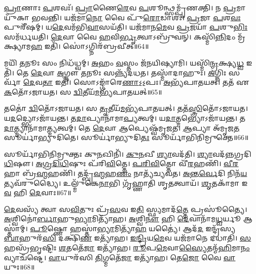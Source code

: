 \-\ul{𑌪𑍍𑌰𑌾}\-𑌣𑌾𑌃 \ul{𑌪}\-𑌶𑌵𑌃᳴।
\-\ul{𑌪𑍍𑌰𑌾}\-𑌣𑍈\-\ul{𑌰𑍇}\-𑌵 \ul{𑌪}\-𑌶𑍂𑌨𑍍𑌥𑍍𑌸𑌮𑍍𑌪𑍃᳴𑌣𑌕𑍍𑌤𑌿।
𑌨 \ul{𑌪𑍍𑌰}\-𑌮𑌾𑌯𑍁᳴𑌕𑌾 𑌭𑌵𑌨𑍍𑌤𑌿।
𑌯𑌜᳴𑌮𑌾\-\ul{𑌨𑍋} 𑌵𑍈 𑌪𑍁᳴\-\ul{𑌰𑍋}\-𑌡𑌾𑌶𑌃᳴।
\-\ul{𑌪𑍍𑌰}\-𑌜𑌾 \ul{𑌪}\-𑌶\-\ul{𑌵𑌃} 𑌪𑍁𑌰𑍀᳴𑌷𑌮𑍍।
𑌯\-\ul{𑌦𑍇}\-𑌵𑌮᳴𑌭𑌿\-\ul{𑌵𑌾}\-𑌸𑌯᳴𑌤𑌿।
𑌯𑌜᳴𑌮𑌾𑌨\-\ul{𑌮𑍇}\-𑌵 \ul{𑌪𑍍𑌰}\-𑌜𑌯𑌾᳴ \ul{𑌪}\-𑌶𑍁\-\ul{𑌭𑌿𑌃} 𑌸𑌮᳴𑌰𑍍𑌧𑌯𑌤𑌿।
\-\ul{𑌦𑍇}\-𑌵𑌾 𑌵𑍈 \ul{𑌹}\-𑌵𑌿\-\ul{𑌰𑍍𑌭𑍃}\-𑌤𑍍𑌵𑌾\-𑌽𑌬𑍍𑌰𑍁᳴𑌵𑌨𑍍।
𑌕𑌸𑍍𑌮𑌿᳴\-\ul{𑌨𑍍𑌨𑌿}\-𑌦𑌂 𑌮𑍍𑌰᳴𑌕𑍍𑌷𑍍𑌯𑌾𑌮\-\ul{𑌹} 𑌇𑌤𑌿᳴।
𑌸𑍋॑𑌽𑌗𑍍𑌨𑌿𑌰᳴𑌬𑍍𑌰𑌵𑍀𑌤𑍍॥64॥

𑌮𑌯𑌿᳴ \ul{𑌤}\-𑌨𑍂𑌃 𑌸𑌂 𑌨𑌿𑌧᳴𑌧𑍍𑌵𑌮𑍍।
\-\ul{𑌅}\-𑌹𑌂 \ul{𑌵}\-𑌸𑍍𑌤𑌂 𑌜᳴𑌨𑌯𑌿𑌷𑍍𑌯𑌾𑌮𑌿।
𑌯𑌸𑍍𑌮𑌿᳴\-\ul{𑌨𑍍𑌮𑍍𑌰}\-𑌕𑍍𑌷𑍍𑌯\-\ul{𑌧𑍍𑌵} 𑌇𑌤𑌿᳴।
𑌤𑍇 \ul{𑌦𑍇}\-𑌵𑌾 \ul{𑌅}\-𑌗𑍍𑌨𑍗 \ul{𑌤}\-𑌨𑍂𑌃 𑌸𑌨𑍍𑌨𑍍𑌯᳴𑌦𑌧𑌤।
𑌤𑌸𑍍𑌮𑌾᳴𑌦𑌾𑌹𑍁𑌃।
\-\ul{𑌅}\-𑌗𑍍𑌨𑌿𑌃 𑌸𑌰𑍍𑌵𑌾᳴ \ul{𑌦𑍇}\-𑌵\-\ul{𑌤𑌾} 𑌇𑌤𑌿᳴।
𑌸𑍋𑌽𑌙𑍍𑌗𑌾᳴𑌰𑍇\-\ul{𑌣𑌾}\-𑌽॒𑌽॒𑌪𑌃।
\-\ul{𑌅}\-𑌭𑍍𑌯᳴𑌪𑌾𑌤𑌯𑌤𑍍।
𑌤𑌤᳴ 𑌏\-\ul{𑌕}\-𑌤𑍋᳴\-𑌽𑌜𑌾𑌯𑌤।
𑌸 \ul{𑌦𑍍𑌵𑌿}\-𑌤𑍀𑌯᳴\-\ul{𑌮}\-𑌭𑍍𑌯᳴\-𑌪𑌾𑌤𑌯𑌤𑍍॥65॥

𑌤𑌤𑍋॑ \ul{𑌦𑍍𑌵𑌿}\-𑌤𑍋᳴\-𑌽𑌜𑌾𑌯𑌤।
𑌸 \ul{𑌤𑍃}\-𑌤𑍀𑌯᳴\-\ul{𑌮}\-𑌭𑍍𑌯᳴𑌪𑌾𑌤𑌯𑌤𑍍।
𑌤𑌤᳴\-\ul{𑌸𑍍𑌤𑍍𑌰𑌿}\-𑌤𑍋᳴\-𑌽𑌜𑌾𑌯𑌤।
𑌯\-\ul{𑌦}\-𑌦𑍍𑌭𑍍𑌯𑍋\-𑌽𑌜𑌾᳴𑌯𑌨𑍍𑌤।
𑌤\-\ul{𑌦𑌾}\-𑌪𑍍𑌯𑌾𑌨𑌾᳴𑌮𑌾\-\ul{𑌪𑍍𑌯}\-𑌤𑍍𑌵𑌮𑍍।
𑌯\-\ul{𑌦𑌾}\-𑌤𑍍𑌮𑌭𑍍𑌯𑍋\-𑌽𑌜𑌾᳴𑌯𑌨𑍍𑌤।
𑌤\-\ul{𑌦𑌾}\-𑌤𑍍𑌮𑍍𑌯𑌾𑌨𑌾᳴𑌮𑌾\-\ul{𑌤𑍍𑌮𑍍𑌯}\-𑌤𑍍𑌵𑌮𑍍।
𑌤𑍇 \ul{𑌦𑍇}\-𑌵𑌾 \ul{𑌆}\-𑌪𑍍𑌯𑍇𑌷𑍍𑌵᳴𑌮𑍃𑌜𑌤।
\-\ul{𑌆}\-𑌪𑍍𑌯𑌾 𑌅᳴𑌮𑍃𑌜\-\ul{𑌤} 𑌸𑍂𑌰𑍍𑌯𑌾॑𑌭𑍍𑌯𑍁𑌦𑌿𑌤𑍇।
𑌸𑍂𑌰𑍍𑌯𑌾॑𑌭𑍍𑌯𑍁𑌦𑌿\-\ul{𑌤𑌃} 𑌸𑍂𑌰𑍍𑌯𑌾᳴𑌭𑌿𑌨𑌿𑌮𑍍𑌰𑍁𑌕𑍍𑌤𑍇॥66॥

𑌸𑍂𑌰𑍍𑌯𑌾᳴𑌭𑌿𑌨𑌿𑌮𑍍𑌰𑍁𑌕𑍍𑌤𑌃 𑌕𑍁\-\ul{𑌨}\-𑌖𑌿𑌨𑌿᳴।
\-\ul{𑌕𑍁}\-\-\ul{𑌨}\-𑌖𑍀 \ul{𑌶𑍍𑌯𑌾}\-𑌵𑌦᳴𑌤𑌿।
\-\ul{𑌶𑍍𑌯𑌾}\-𑌵𑌦᳴𑌨𑍍𑌨𑌗𑍍𑌰\-𑌦𑌿\-\ul{𑌧𑌿}\-𑌷𑍗।
\-\ul{𑌅}\-\-\ul{𑌗𑍍𑌰}\-\-\ul{𑌦𑌿}\-\-\ul{𑌧𑌿}\-𑌷𑍁𑌃 𑌪᳴𑌰𑌿\-\ul{𑌵𑌿}\-𑌤𑍍𑌤𑍇।
\-\ul{𑌪}\-\-\ul{𑌰𑌿}\-\-\ul{𑌵𑌿}\-𑌤𑍍𑌤𑍋 𑌵𑍀᳴\-\ul{𑌰}\-𑌹𑌣𑌿᳴।
\-\ul{𑌵𑍀}\-\-\ul{𑌰}\-𑌹𑌾 𑌬𑍍𑌰᳴\-\ul{𑌹𑍍𑌮}\-𑌹𑌣𑌿᳴।
𑌤𑌦𑍍𑌬𑍍𑌰᳴\-\ul{𑌹𑍍𑌮}\-𑌹\-\ul{𑌣𑌂} 𑌨𑌾𑌤𑍍𑌯᳴𑌚𑍍𑌯𑌵𑌤।
\-\ul{𑌅}\-\-\ul{𑌨𑍍𑌤}\-\-\ul{𑌰𑍍𑌵𑍇}\-𑌦𑌿 𑌨𑌿𑌨᳴\-\ul{𑌯}\-𑌤𑍍𑌯𑌵᳴𑌰𑍁𑌦𑍍𑌧𑍍𑌯𑍈।
𑌉𑌲𑍍𑌮𑍁᳴𑌕𑍇\-\ul{𑌨𑌾}\-𑌭𑌿 𑌗𑍃᳴𑌹𑍍𑌣𑌾𑌤𑌿 𑌶𑍃\-\ul{𑌤}\-𑌤𑍍𑌵𑌾𑌯᳴।
\-\ul{𑌶𑍃}\-𑌤𑌕𑌾᳴𑌮𑌾 𑌇\-\ul{𑌵} 𑌹𑌿 \ul{𑌦𑍇}\-𑌵𑌾𑌃॥67॥\anuvakamend[\-\ul{𑌅}\-𑌨𑍍𑌯𑌾 𑌜𑌿᳴𑌨𑍍𑌵𑌨𑍍𑌤𑍍𑌯𑌨𑍁 \ul{𑌵𑌿}\-𑌸𑍃\-\ul{𑌤𑍍𑌯𑍈}\-𑌵\-\ul{𑌮𑌾}\-𑌹𑌾𑌶𑌾॑𑌨𑍍𑌤 𑌆\-\ul{𑌹} 𑌗𑍁𑌪𑍍𑌤𑍍𑌯𑍈᳴ \ul{𑌛}\-𑌨𑍍𑌨𑌂 𑌬𑍍𑌰𑌹𑍍𑌮𑌾॑𑌬𑍍𑌰𑌵𑍀\-\ul{𑌦𑍍𑌦𑍍𑌵𑌿}\-𑌤𑍀𑌯᳴\-\ul{𑌮}\-𑌭𑍍𑌯᳴𑌪𑌾𑌤\-\ul{𑌯}\-𑌥𑍍𑌸𑍂𑌰𑍍𑌯𑌾᳴𑌭𑌿𑌨𑌿𑌮𑍍𑌰𑍁𑌕𑍍𑌤𑍇 \ul{𑌦𑍇}\-𑌵𑌾𑌃]

\-\ul{𑌦𑍇}\-𑌵𑌸𑍍𑌯᳴ 𑌤𑍍𑌵𑌾 𑌸\-\ul{𑌵𑌿}\-𑌤𑍁𑌃 𑌪𑍍𑌰᳴\-\ul{𑌸}\-𑌵 𑌇\-\ul{𑌤𑌿} 𑌸𑍍𑌫𑍍𑌯𑌮𑌾𑌦᳴\-\ul{𑌤𑍍𑌤𑍇} 𑌪𑍍𑌰𑌸𑍂॑𑌤𑍍𑌯𑍈।
\-\ul{𑌅}\-𑌶𑍍𑌵𑌿𑌨𑍋॑\-\ul{𑌰𑍍𑌬𑌾}\-𑌹𑍁\-\ul{𑌭𑍍𑌯𑌾}\-𑌮𑌿𑌤𑍍𑌯𑌾᳴𑌹।
\-\ul{𑌅}\-𑌶𑍍𑌵𑌿\-\ul{𑌨𑍗} 𑌹𑌿 \ul{𑌦𑍇}\-𑌵𑌾𑌨𑌾᳴𑌮\-\ul{𑌧𑍍𑌵}\-𑌰𑍍𑌯𑍂 𑌆𑌸𑍍𑌤𑌾॑𑌮𑍍।
\-\ul{𑌪𑍂}\-𑌷𑍍𑌣𑍋 𑌹𑌸𑍍𑌤𑌾॑\-\ul{𑌭𑍍𑌯𑌾}\-𑌮𑌿𑌤𑍍𑌯𑌾᳴\-\ul{𑌹} 𑌯𑌤𑍍𑌯𑍈॑।
𑌆𑌦᳴\-\ul{𑌦} 𑌇𑌨𑍍𑌦𑍍𑌰᳴𑌸𑍍𑌯 \ul{𑌬𑌾}\-𑌹𑍁𑌰᳴\-\ul{𑌸𑌿} 𑌦𑌕𑍍𑌷𑌿᳴\-\ul{𑌣} 𑌇𑌤𑍍𑌯𑌾᳴𑌹।
\-\ul{𑌇}\-\-\ul{𑌨𑍍𑌦𑍍𑌰𑌿}\-𑌯\-\ul{𑌮𑍇}\-𑌵 𑌯𑌜᳴𑌮𑌾𑌨𑍇 𑌦𑌧𑌾𑌤𑌿।
\-\ul{𑌸}\-𑌹𑌸𑍍𑌰᳴𑌭𑍃𑌷𑍍𑌟𑌿𑌃 \ul{𑌶}\-𑌤𑌤𑍇᳴\-\ul{𑌜𑌾} 𑌇𑌤𑍍𑌯𑌾᳴𑌹।
\-\ul{𑌰𑍂}\-𑌪\-\ul{𑌮𑍇}\-𑌵𑌾\-\ul{𑌸𑍍𑌯𑍈}\-𑌤𑌨𑍍𑌮᳴\-\ul{𑌹𑌿}\-𑌮𑌾\-\ul{𑌨𑌂} 𑌵𑍍𑌯𑌾𑌚᳴𑌷𑍍𑌟𑍇।
\-\ul{𑌵𑌾}\-𑌯𑍁𑌰᳴𑌸𑌿 \ul{𑌤𑌿}\-𑌗𑍍𑌮𑌤𑍇᳴\-\ul{𑌜𑌾} 𑌇𑌤𑍍𑌯𑌾᳴𑌹।
𑌤𑍇\-\ul{𑌜𑍋} 𑌵𑍈 \ul{𑌵𑌾}\-𑌯𑍁𑌃॥68॥

